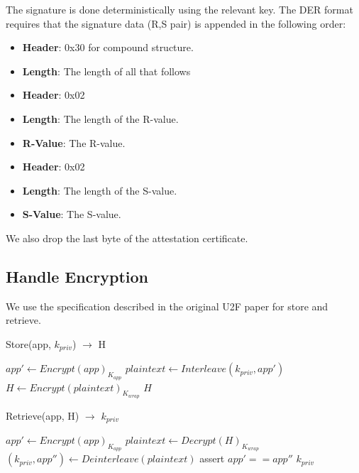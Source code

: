 \documentclass[acmtog,review]{acmart}
\begin{document}
The signature is done deterministically using the relevant key. The DER format requires that the signature
data (R,S pair) is appended in the following order:

\begin{itemize}
    \item \textbf{Header}: 0x30 for compound structure.
    \item \textbf{Length}: The length of all that follows 
    \item \textbf{Header}: 0x02
    \item \textbf{Length}: The length of the R-value.
    \item \textbf{R-Value}: The R-value.
    \item \textbf{Header}: 0x02
    \item \textbf{Length}: The length of the S-value.
    \item \textbf{S-Value}: The S-value.
\end{itemize}

We also drop the last byte of the attestation certificate.

\subsection{Handle Encryption}

We use the specification described in the original U2F paper for store and retrieve.

\begin{algorithm}
    \caption{Store(app, $k_{priv}$) $\rightarrow$ H}
    \label{alg:store}
    \begin{algorithmic}
        \STATE $app' \leftarrow Encrypt(app)_{K_{app}}$
        \STATE $plaintext \leftarrow Interleave(k_{priv},app')$
        \STATE $H \leftarrow Encrypt(plaintext)_{K_{wrap}}$
        \RETURN $H$
    \end{algorithmic}
\end{algorithm}

\begin{algorithm}
    \caption{Retrieve(app, H) $\rightarrow$ $k_{priv}$ }
    \label{alg:retrieve}
    \begin{algorithmic}
        \STATE $app' \leftarrow Encrypt(app)_{K_{app}}$
        \STATE $plaintext \leftarrow Decrypt(H)_{K_{wrap}}$
        \STATE $(k_{priv},app'') \leftarrow Deinterleave(plaintext)$
        \STATE assert $app' == app''$
        \RETURN $k_{priv}$
    \end{algorithmic}
\end{algorithm}
\end{document}
